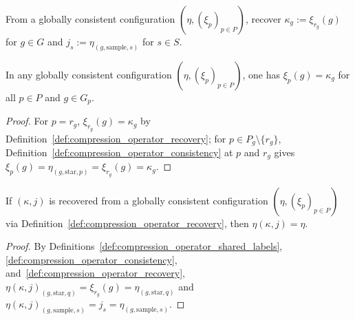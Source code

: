 \begin{definition}
    \label{def:compression_operator_recovery}
    \leanok
    From a globally consistent configuration $(\eta,(\xi_p)_{p\in P})$, recover $\kappa_g:=\xi_{r_g}(g)$ for $g\in G$ and $j_s:=\eta_{(g,\mathrm{sample},s)}$ for $s\in S$.
\end{definition}

\begin{lemma}
    \label{thm:compression_operator_root_agreement}
    \leanok
    In any globally consistent configuration $(\eta,(\xi_p)_{p\in P})$, one has $\xi_p(g)=\kappa_g$ for all $p\in P$ and $g\in G_p$.
\end{lemma}

\begin{proof}\leanok
    For $p=r_g$, $\xi_{r_g}(g)=\kappa_g$ by Definition~\ref{def:compression_operator_recovery}; for $p\in P_g\setminus\{r_g\}$, Definition~\ref{def:compression_operator_consistency} at $p$ and $r_g$ gives $\xi_p(g)=\eta_{(g,\mathrm{star},p)}=\xi_{r_g}(g)=\kappa_g$.
\end{proof}

\begin{lemma}
    \label{thm:compression_operator_link_recovery}
    \leanok
    If $(\kappa,j)$ is recovered from a globally consistent configuration $(\eta,(\xi_p)_{p\in P})$ via Definition~\ref{def:compression_operator_recovery}, then $\eta(\kappa,j)=\eta$.
\end{lemma}

\begin{proof}\leanok
    By Definitions~\ref{def:compression_operator_shared_labels}, \ref{def:compression_operator_consistency}, and~\ref{def:compression_operator_recovery}, $\eta(\kappa,j)_{(g,\mathrm{star},q)}=\xi_{r_g}(g)=\eta_{(g,\mathrm{star},q)}$ and $\eta(\kappa,j)_{(g,\mathrm{sample},s)}=j_s=\eta_{(g,\mathrm{sample},s)}$.
\end{proof}

